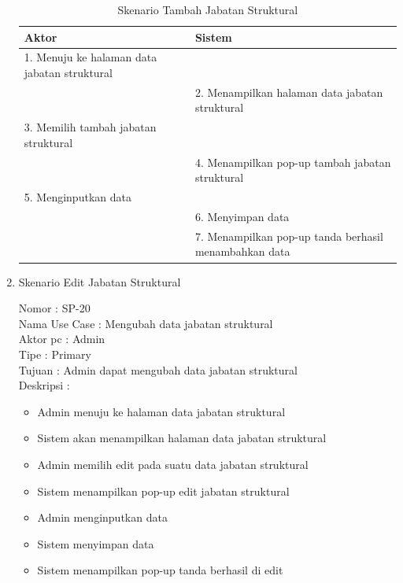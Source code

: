 \begin{enumerate}
\begin{table}
	\caption{Skenario Tambah Jabatan Struktural}
	\centering
	\begin{tabular}{ | p{55mm} | p{70mm} |}
		\hline 
		\textbf{Aktor} & \textbf{Sistem} \\
		\hline
		
		1.	Menuju ke halaman data jabatan struktural &  \\
		
		\hline
		
		&  2.	Menampilkan halaman data jabatan struktural\\
		
		\hline
		
		3. Memilih tambah jabatan struktural& \\
		
		\hline
		
		& 4.	Menampilkan pop-up tambah jabatan struktural\\
		
		\hline
		
		5.	Menginputkan data  & \\
		\hline
		
		& 6.	Menyimpan data \\
		\hline
		
		& 7.	Menampilkan pop-up tanda berhasil menambahkan data \\
		\hline
		
	\end{tabular}
\end{table}

\item Skenario Edit Jabatan Struktural

Nomor \kern 3.6pc : SP-20 \\
Nama Use Case : Mengubah data jabatan struktural \\
Aktor  pc : Admin \\
Tipe \kern 4.6pc : Primary \\
Tujuan \kern 3.6pc : Admin dapat mengubah data jabatan struktural\\
Deskripsi \kern 2.5pc : 

\begin{itemize}
	\item Admin menuju ke halaman data jabatan struktural
	\item Sistem akan menampilkan halaman data jabatan struktural
	\item Admin memilih edit pada suatu data jabatan struktural
	\item Sistem menampilkan pop-up edit jabatan struktural
	\item Admin menginputkan data
	\item Sistem menyimpan data
	\item Sistem menampilkan pop-up tanda berhasil di edit
	

\end{itemize}
\end{enumerate}
